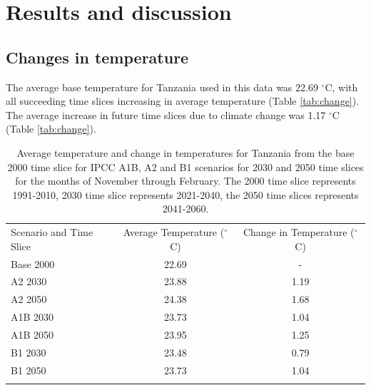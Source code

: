     \section{Results and discussion}
    \label{results_and_discussion}
    
    \subsection{Changes in temperature}
    \label{temperature_changes}
    The average base temperature for Tanzania used in this data was 22.69 $^{\circ}$C, with all succeeding time slices increasing in average temperature (Table \ref{tab:change}). The average increase in future time slices due to climate change was 1.17 $^{\circ}$C (Table \ref{tab:change}).
    
    
\begin{table}
\caption{Average temperature and change in temperatures  for Tanzania from the base 2000 time slice for IPCC A1B, A2 and B1 scenarios for 2030 and 2050 time slices for the months of November through February. The 2000 time slice represents 1991-2010, 2030 time slice represents 2021-2040, the 2050 time slices represents 2041-2060.}
\label{tab:1}       %
    \begin{tabular}{@{}lcc@{}}
\hline\noalign{\smallskip}
Scenario and Time Slice      & Average Temperature ($^{\circ}$C) & Change in Temperature ($^{\circ}$C)  \\
\noalign{\smallskip}\hline\noalign{\smallskip}
	Base 2000 	& 22.69                       & -                                   \\
    A2 2030  	& 23.88                       & 1.19                                \\
    A2 2050  	& 24.38                       & 1.68                                \\
    A1B 2030   	& 23.73                       & 1.04                                \\
    A1B 2050   	& 23.95                       & 1.25                                \\
    B1 2030   	& 23.48                       & 0.79                                \\
    B1 2050   	& 23.73                       & 1.04                                \\ 
\noalign{\smallskip}\hline
\end{tabular}
\end{table}  

